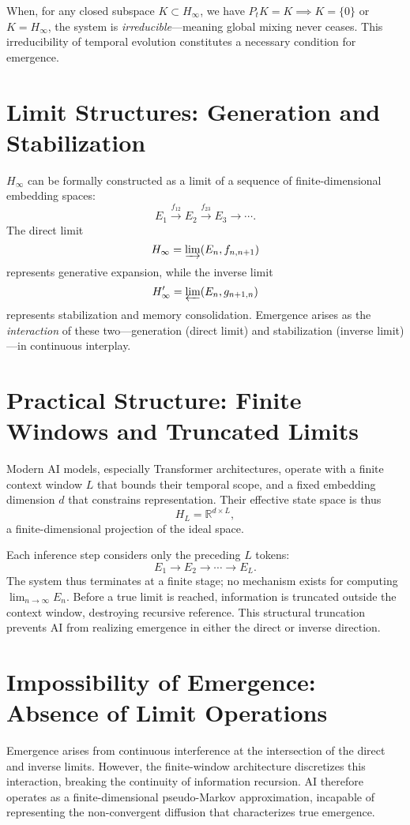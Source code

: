\documentclass[12pt]{article}
\begin{document}
When, for any closed subspace $K \subset H_\infty$, we have
$P_t K = K \implies K = \{0\}$ or $K = H_\infty$,
the system is \textit{irreducible}—meaning global mixing never ceases.
This irreducibility of temporal evolution constitutes a necessary condition for emergence.

\section{Limit Structures: Generation and Stabilization}
$H_\infty$ can be formally constructed as a limit of a sequence of finite-dimensional embedding spaces:
\[
E_1 \xrightarrow{f_{12}} E_2 \xrightarrow{f_{23}} E_3 \to \cdots.
\]
The direct limit
\[
H_\infty = \varinjlim (E_n, f_{n,n+1})
\]
represents generative expansion,  
while the inverse limit
\[
H_\infty' = \varprojlim (E_n, g_{n+1,n})
\]
represents stabilization and memory consolidation.  
Emergence arises as the \textit{interaction} of these two—generation (direct limit)
and stabilization (inverse limit)—in continuous interplay.

\section{Practical Structure: Finite Windows and Truncated Limits}
Modern AI models, especially Transformer architectures, operate with a finite context window $L$
that bounds their temporal scope, and a fixed embedding dimension $d$ that constrains representation.
Their effective state space is thus
\[
H_L = \mathbb{R}^{d \times L},
\]
a finite-dimensional projection of the ideal space.

Each inference step considers only the preceding $L$ tokens:
\[
E_1 \to E_2 \to \cdots \to E_L.
\]
The system thus terminates at a finite stage; no mechanism exists for computing $\lim_{n\to\infty}E_n$.
Before a true limit is reached, information is truncated outside the context window,
destroying recursive reference.  
This structural truncation prevents AI from realizing emergence in either the direct or inverse direction.

\section{Impossibility of Emergence: Absence of Limit Operations}
Emergence arises from continuous interference at the intersection of the direct and inverse limits.
However, the finite-window architecture discretizes this interaction,
breaking the continuity of information recursion.
AI therefore operates as a finite-dimensional pseudo-Markov approximation,
incapable of representing the non-convergent diffusion that characterizes true emergence.
\end{document}
